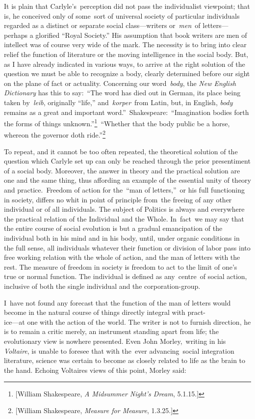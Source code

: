 \documentclass[twoside,symmetric,nobib,justified]{tufte-book}
\begin{document}
\noindent It is plain that Carlyle's~perception did not pass the individualist
viewpoint; that is, he conceived only of some~sort of universal society
of particular individuals regarded as a distinct or separate social
class---writers or~\emph{men}~of letters---perhaps a glorified ``Royal
Society.'' His assumption that book writers are men of intellect was of
course very wide of the mark. The necessity is to bring into clear
relief the function of literature or the moving intelligence in the
social body. But, as I have already indicated in various ways, to arrive
at the right solution of the question we must be able to recognize a
body, clearly determined before our sight on the plane of fact or
actuality. Concerning our word~\emph{body}, the \emph{New English
Dictionary} has this to say:~``The word has died out in German, its
place being taken by~\emph{leib}, originally ``life,''
and~\emph{korper}~from Latin, but, in English, \emph{body} remains as a
great and important word.''~Shakespeare:~``Imagination bodies forth the
forms of things unknown.''\footnote{{[}William Shakespeare, \emph{A
  Midsummer Night's Dream}, 5.1.15.{]}}~``Whether that the body public
be a horse, whereon the governor doth ride.''\footnote{{[}William
  Shakespeare, \emph{Measure for Measure}, 1.3.25.{]}}~

To repeat, and it cannot be too often repeated, the theoretical solution
of the question which Carlyle set up can only be reached through the
prior presentiment of a social body. Moreover, the answer in theory and
the practical solution are one and the same thing, thus affording an
example of the essential unity of theory and practice.~Freedom of action
for the~``man of letters,''~or his full functioning in society, differs
no whit in point of principle from~the freeing of any other individual
or of all individuals. The subject of Politics is always and everywhere
the practical relation of the Individual and the Whole. In~fact~we may
say that the entire course of social evolution is but a gradual
emancipation of the individual both in his mind and in his body, until,
under organic conditions in the full sense, all individuals whatever
their function or division of labor pass into free working relation with
the whole of action, and the man of letters with the rest. The measure
of freedom in society is freedom to act to the limit of one's true or
normal function. The individual is defined as any~centre~of social
action, inclusive of both the single individual and the
corporation-group.~~

I~have not found any forecast that the function of the man of letters
would become in the natural course of things directly integral with
pract-\\\noindent ice---at one with the action of the world. The writer is not to
furnish direction, he is to remain a critic merely, an instrument
standing apart from life; the evolutionary view is nowhere presented.
Even John Morley,~writing in his \emph{Voltaire}, is unable to foresee
that with the~ever advancing~social integration literature, science was
certain to become as closely related to life as the brain to the hand.
Echoing Voltaire\textquotesingle s views of this point, Morley said:~
\end{document}
